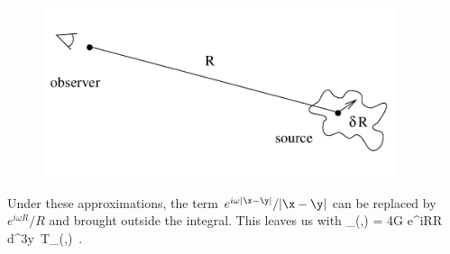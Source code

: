 \documentclass[12pt]{article}
\begin{document}
\begin{figure}[h]
  \centerline{
  \includegraphics[height=5cm]{pdf/six7}}
\end{figure}

\noindent Under these approximations, the term 
$e^{i\omega |\x-\y |}/|\x-\y |$ can be replaced by $e^{i\omega R}/R$
and brought outside the integral.  This leaves us with
\be
  \widetilde\bh_\mn(\omega,\x) = 4G {{e^{i\omega R}}\over R}
  \int d^3y~\widetilde T_\mn(\omega,\y)\ .\label{6.78}
\ee
\end{document}
